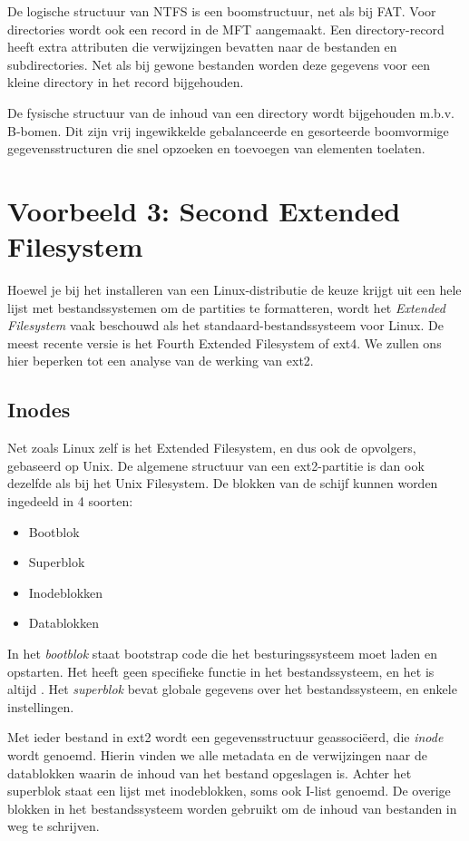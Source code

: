 De logische structuur van NTFS is een boomstructuur, net als bij
FAT. Voor directories wordt ook een record in de MFT aangemaakt. Een
directory-record heeft extra attributen die verwijzingen bevatten naar
de bestanden en subdirectories. Net als bij gewone bestanden worden
deze gegevens voor een kleine directory in het record
bijgehouden.

De fysische structuur van de inhoud van een directory wordt
bijgehouden m.b.v. B-bomen. Dit zijn vrij ingewikkelde gebalanceerde
en gesorteerde boomvormige gegevensstructuren die snel opzoeken en
toevoegen van elementen toelaten.

\section{Voorbeeld 3: Second Extended Filesystem}

Hoewel je bij het installeren van een Linux-distributie de keuze krijgt
uit een hele lijst met bestandssystemen om de partities te formatteren,
wordt het \emph{Extended Filesystem} vaak beschouwd als het standaard-bestandssysteem
voor Linux. De meest recente versie is het Fourth Extended Filesystem of ext4. We zullen
ons hier beperken tot een analyse van de werking van ext2.

\subsection{Inodes}

Net zoals Linux zelf is het Extended Filesystem, en dus ook de opvolgers, gebaseerd op
Unix. De algemene structuur van een ext2-partitie is dan ook dezelfde als bij het
Unix Filesystem. De blokken van de schijf kunnen worden ingedeeld in 4 soorten:

\begin{itemize}
\item Bootblok
\item Superblok
\item Inodeblokken
\item Datablokken
\end{itemize}

In het \emph{bootblok} staat bootstrap code die het besturingssysteem moet laden en opstarten.
Het heeft geen specifieke functie in het bestandssysteem, en het is altijd . Het \emph{superblok} bevat globale
gegevens over het bestandssysteem, en enkele instellingen.

Met ieder bestand in ext2 wordt een gegevensstructuur geassoci\"eerd, die \emph{inode} wordt genoemd.
Hierin vinden we alle metadata en de verwijzingen naar de datablokken waarin de inhoud
van het bestand opgeslagen is. Achter het superblok staat een lijst met inodeblokken, soms ook
I-list genoemd. De overige blokken in het bestandssysteem worden gebruikt om de inhoud van bestanden
in weg te schrijven.


